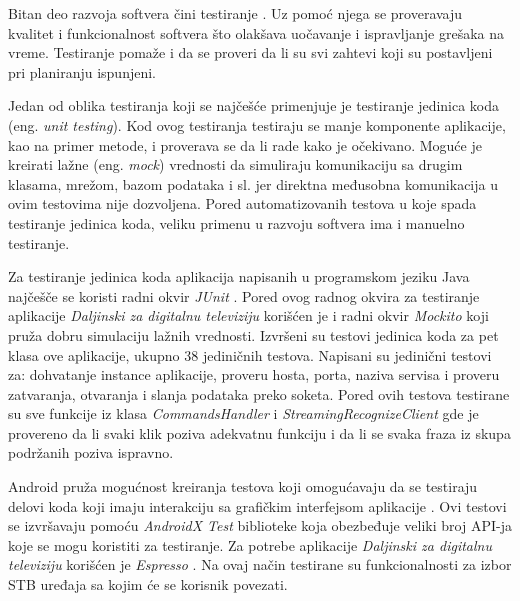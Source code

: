 \documentclass[../TamaraIvanovicMasterRad.tex]{subfiles}
\begin{document}
Bitan deo razvoja softvera čini testiranje \cite{book:testiranjeRigorousSoftwareDev}. Uz pomoć njega se proveravaju kvalitet i funkcionalnost softvera što olakšava uočavanje i ispravljanje grešaka na vreme. Testiranje pomaže i da se proveri da li su svi zahtevi koji su postavljeni pri planiranju ispunjeni. 

Jedan od oblika testiranja koji se najčešće primenjuje je testiranje jedinica koda (eng. \textit{unit testing}). Kod ovog testiranja testiraju se manje komponente aplikacije, kao na primer metode, i proverava se da li rade kako je očekivano. Moguće je kreirati lažne (eng. \textit{mock}) vrednosti da simuliraju komunikaciju sa drugim klasama, mrežom, bazom podataka i sl. jer direktna međusobna komunikacija u ovim testovima nije dozvoljena. Pored automatizovanih testova u koje spada testiranje jedinica koda, veliku primenu u razvoju softvera ima i manuelno testiranje. 

Za testiranje jedinica koda aplikacija napisanih u programskom jeziku Java najčešče se koristi radni okvir \textit{JUnit} \cite{sajt:junit}. Pored ovog radnog okvira za testiranje aplikacije \textit{Daljinski za digitalnu televiziju} korišćen je i radni okvir \textit{Mockito} \cite{sajt:mockito} koji pruža dobru simulaciju lažnih vrednosti. Izvršeni su testovi jedinica koda za pet klasa ove aplikacije, ukupno 38 jediničnih testova. Napisani su jedinični testovi za: dohvatanje instance aplikacije, proveru hosta, porta, naziva servisa i proveru zatvaranja, otvaranja i slanja podataka preko soketa. Pored ovih testova testirane su sve funkcije iz klasa \textit{CommandsHandler} i \textit{StreamingRecognizeClient} gde je provereno da li svaki klik poziva adekvatnu funkciju i da li se svaka fraza iz skupa podržanih poziva ispravno.

Android pruža mogućnost kreiranja testova koji omogućavaju da se testiraju delovi koda koji imaju interakciju sa grafičkim interfejsom aplikacije \cite{sajt:instrumentedT}. Ovi testovi se izvršavaju pomoću \textit{AndroidX Test} biblioteke koja obezbeđuje veliki broj API-ja koje se mogu koristiti za testiranje. Za potrebe aplikacije \textit{Daljinski za digitalnu televiziju} korišćen je \textit{Espresso} \cite{sajt:espresspT}. Na ovaj način testirane su funkcionalnosti za izbor STB uređaja sa kojim će se korisnik povezati. 
\end{document}
